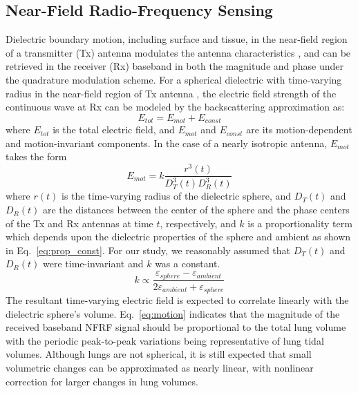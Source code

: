 \documentclass[journal]{IEEEtran}
\begin{document}
\subsection{Near-Field Radio-Frequency Sensing}
Dielectric boundary motion, including surface and tissue, in the near-field region of a transmitter (Tx) antenna modulates the antenna characteristics \cite{huiMonitoringVitalSigns2018}, and can be retrieved in the receiver (Rx) baseband in both the magnitude and phase under the quadrature modulation scheme. For a spherical dielectric with time-varying radius in the near-field region of Tx antenna \cite{zhouBackscatterFieldModel2023}, the electric field strength of the continuous wave at Rx can be modeled by the backscattering approximation as:  
\begin{equation}
    E_{tot} = E_{mot} + E_{const}
\end{equation}
where $E_{tot}$ is the total electric field, and $E_{mot}$ and $E_{const}$ are its motion-dependent and motion-invariant components. In the case of a nearly isotropic antenna, $E_{mot}$ takes the form 
\begin{equation}
    E_{mot} = k \frac{r^{3}(t)}{D_{T}^3(t) D_{R}^3(t)} 
    \label{eq:motion}
\end{equation}
where $r(t)$ is the time-varying radius of the dielectric sphere, and $D_T(t)$ and $D_R(t)$ are the distances between the center of the sphere and the phase centers of the Tx and Rx antennas at time $t$, respectively, and $k$ is a proportionality term which depends upon the dielectric properties of the sphere and ambient as shown in Eq.~\ref{eq:prop_const}. For our study, we reasonably assumed that $D_T(t)$ and $D_R(t)$ were time-invariant and $k$ was a constant. 
\begin{equation}
    k \propto \frac{\varepsilon_{sphere} - \varepsilon_{ambient}}{2\varepsilon_{ambient} + \varepsilon_{sphere}}
    \label{eq:prop_const}
\end{equation}
The resultant time-varying electric field is expected to correlate linearly with the dielectric sphere's volume. Eq.~\ref{eq:motion} indicates that the magnitude of the received baseband NFRF signal should be proportional to the total lung volume with the periodic peak-to-peak variations being representative of lung tidal volumes. Although lungs are not spherical, it is still expected that small volumetric changes can be approximated as nearly linear, with nonlinear correction for larger changes in lung volumes. 
\end{document}
